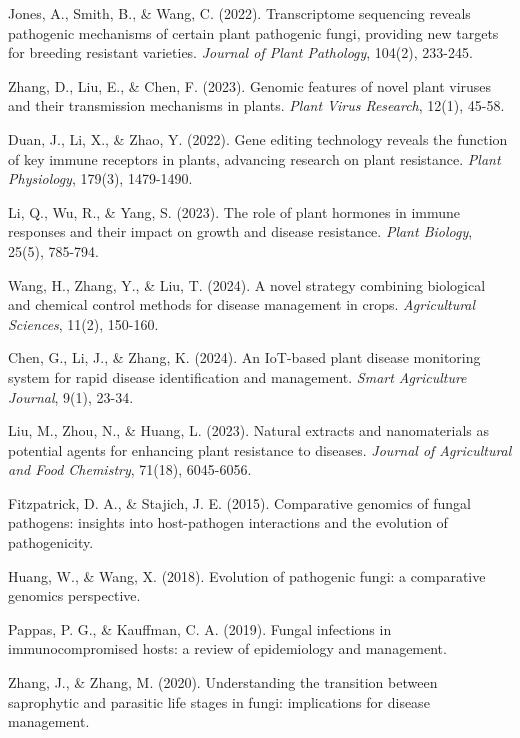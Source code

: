 \documentclass{article}
\begin{document}
\begin{thebibliography}{99}
Jones, A., Smith, B., \& Wang, C. (2022). Transcriptome sequencing reveals pathogenic mechanisms of certain plant pathogenic fungi, providing new targets for breeding resistant varieties. \textit{Journal of Plant Pathology}, 104(2), 233-245.

Zhang, D., Liu, E., \& Chen, F. (2023). Genomic features of novel plant viruses and their transmission mechanisms in plants. \textit{Plant Virus Research}, 12(1), 45-58.

Duan, J., Li, X., \& Zhao, Y. (2022). Gene editing technology reveals the function of key immune receptors in plants, advancing research on plant resistance. \textit{Plant Physiology}, 179(3), 1479-1490.

Li, Q., Wu, R., \& Yang, S. (2023). The role of plant hormones in immune responses and their impact on growth and disease resistance. \textit{Plant Biology}, 25(5), 785-794.

Wang, H., Zhang, Y., \& Liu, T. (2024). A novel strategy combining biological and chemical control methods for disease management in crops. \textit{Agricultural Sciences}, 11(2), 150-160.

Chen, G., Li, J., \& Zhang, K. (2024). An IoT-based plant disease monitoring system for rapid disease identification and management. \textit{Smart Agriculture Journal}, 9(1), 23-34.

Liu, M., Zhou, N., \& Huang, L. (2023). Natural extracts and nanomaterials as potential agents for enhancing plant resistance to diseases. \textit{Journal of Agricultural and Food Chemistry}, 71(18), 6045-6056.
	
 Fitzpatrick, D. A., \& Stajich, J. E. (2015). Comparative genomics of fungal pathogens: insights into host-pathogen interactions and the evolution of pathogenicity.

 Huang, W., \& Wang, X. (2018). Evolution of pathogenic fungi: a comparative genomics perspective.

 Pappas, P. G., \& Kauffman, C. A. (2019). Fungal infections in immunocompromised hosts: a review of epidemiology and management.

 Zhang, J., \& Zhang, M. (2020). Understanding the transition between saprophytic and parasitic life stages in fungi: implications for disease management.


\end{thebibliography}
\end{document}
